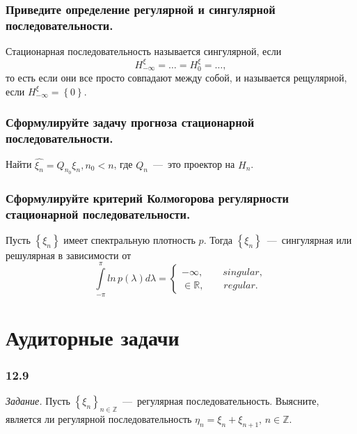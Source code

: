 \subsubsection*{Приведите определение регулярной и сингулярной последовательности.}

Стационарная последовательность называется сингулярной, если
\begin{equation*}
  H_{-\infty }^{ \xi } =
  \dotsc =
  H_0^{ \xi } =
  \dotsc,
\end{equation*}
то есть если они все просто совпадают между собой, и называется рещулярной,
если $H_{-\infty }^{ \xi } = \left\{ 0 \right\} $.

\subsubsection*{Сформулируйте задачу прогноза стационарной последовательности.}

Найти $ \hat{ \xi_n} = Q_{n_0} \xi_n, n_0 < n$, где $Q_n$~---~это проектор на $H_n$.

\subsubsection*{Сформулируйте критерий Колмогорова регулярности стационарной последовательности.}

Пусть $ \left\{ \xi_n \right\} $ имеет спектральную плотность $p$.
Тогда $ \left\{ \xi_n \right\} $~---~сингулярная или решулярная в зависимости от
\begin{equation*}
  \int \limits_{-\pi }^{ \pi } ln \, p \left( \lambda \right) d \lambda =
  \begin{cases}
    -\infty, \qquad singular, \\
    \in \mathbb{R}, \qquad regular.
  \end{cases}
\end{equation*}

\section*{Аудиторные задачи}

\subsubsection*{12.9}

\textit{Задание.}
Пусть $ \left\{ \xi_n \right\}_{n \in \mathbb{Z}}$~---~регулярная последовательность.
Выясните,
является ли регулярной последовательность $ \eta_n = \xi_n + \xi_{n + 1}, \, n \in \mathbb{Z}$.

